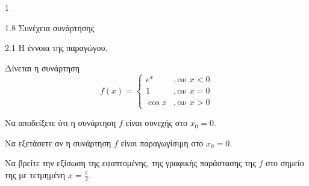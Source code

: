 \begin{ylh}{1}
    \item 1.8 Συνέχεια συνάρτησης
    \item 2.1 Η έννοια της παραγώγου.
\end{ylh}

Δίνεται η συνάρτηση
\[
f(x)=
\begin{cases}
e^x & , \text{αν } x < 0 \\
1 & , \text{αν } x = 0 \\
\cos x & , \text{αν } x > 0
\end{cases}
\]

\begin{alist}
\item Να αποδείξετε ότι η συνάρτηση $f$ είναι συνεχής στο $x_0 = 0$. 
\item Να εξετάσετε αν η συνάρτηση $f$ είναι παραγωγίσιμη στο $x_0 = 0$. 
\item Να βρείτε την εξίσωση της εφαπτομένης, της γραφικής παράστασης της $f$ στο σημείο της με τετμημένη $x = \frac{\pi}{2}$. 
\end{alist}